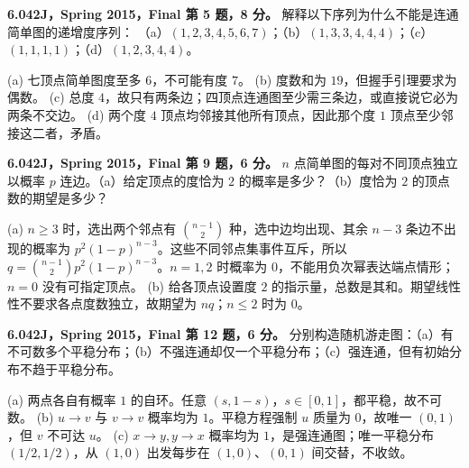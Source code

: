 \begin{exercise}\label{mit:6042-final-q5}
\textbf{6.042J，Spring 2015，Final 第 5 题，8 分。}
解释以下序列为什么不能是连通简单图的递增度序列：
（a）$(1,2,3,4,5,6,7)$；（b）$(1,3,3,4,4,4)$；（c）$(1,1,1,1)$；（d）$(1,2,3,4,4)$。
\end{exercise}
\begin{solution}
(a) 七顶点简单图度至多 $6$，不可能有度 $7$。
(b) 度数和为 $19$，但握手引理要求为偶数。
(c) 总度 $4$，故只有两条边；四顶点连通图至少需三条边，或直接说它必为两条不交边。
(d) 两个度 $4$ 顶点均邻接其他所有顶点，因此那个度 $1$ 顶点至少邻接这二者，矛盾。
\end{solution}

\begin{exercise}\label{mit:6042-final-q9}
\textbf{6.042J，Spring 2015，Final 第 9 题，6 分。}
$n$ 点简单图的每对不同顶点独立以概率 $p$ 连边。（a）给定顶点的度恰为 $2$ 的概率是多少？（b）度恰为 $2$ 的顶点数的期望是多少？
\end{exercise}
\begin{solution}
(a) $n\ge3$ 时，选出两个邻点有 $\binom{n-1}2$ 种，选中边均出现、其余 $n-3$ 条边不出现的概率为 $p^2(1-p)^{n-3}$。这些不同邻点集事件互斥，所以
$q=\binom{n-1}2p^2(1-p)^{n-3}$。$n=1,2$ 时概率为 $0$，不能用负次幂表达端点情形；$n=0$ 没有可指定顶点。
(b) 给各顶点设置度 $2$ 的指示量，总数是其和。期望线性性不要求各点度数独立，故期望为 $nq$；$n\le2$ 时为 $0$。
\end{solution}

\begin{exercise}\label{mit:6042-final-q12}
\textbf{6.042J，Spring 2015，Final 第 12 题，6 分。}
分别构造随机游走图：（a）有不可数多个平稳分布；（b）不强连通却仅一个平稳分布；（c）强连通，但有初始分布不趋于平稳分布。
\end{exercise}
\begin{solution}
(a) 两点各自有概率 $1$ 的自环。任意 $(s,1-s)$，$s\in[0,1]$，都平稳，故不可数。
(b) $u\to v$ 与 $v\to v$ 概率均为 $1$。平稳方程强制 $u$ 质量为 $0$，故唯一 $(0,1)$，但 $v$ 不可达 $u$。
(c) $x\to y,y\to x$ 概率均为 $1$，是强连通图；唯一平稳分布 $(1/2,1/2)$，从 $(1,0)$ 出发每步在 $(1,0)$、$(0,1)$ 间交替，不收敛。
\end{solution}
